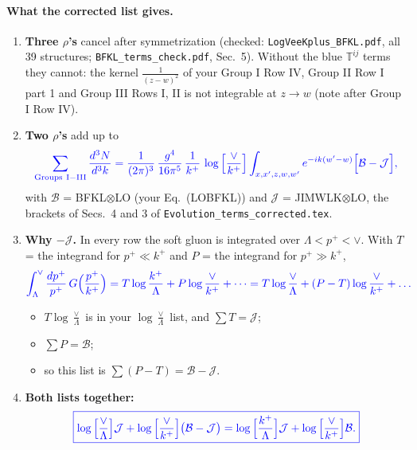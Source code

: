 \documentclass[9pt]{article}
\newcommand{\new}[1]{{\color{blue}#1}}
\numberwithin{equation}{section}
\begin{document}
\paragraph{\new{What the corrected list gives.}}
\begin{enumerate}
\item \new{\textbf{Three $\rho$'s} cancel after symmetrization (checked: \texttt{LogVeeKplus\_BFKL.pdf}, all 39 structures; \texttt{BFKL\_terms\_check.pdf}, Sec.~5). Without the blue $\mathbb T^{ij}$ terms they cannot: the kernel $\frac{1}{(z-w)^2}$ of your Group I Row IV, Group II Row I part 1 and Group III Rows I, II is not integrable at $z\to w$ (note after Group I Row IV).}
\item \new{\textbf{Two $\rho$'s} add up to}
\begin{equation}
\new{\sum_{\rm Groups\ I-III}\frac{d^3N}{d^3k}=\frac{1}{(2\pi)^{3}}\,\frac{g^{4}}{16\pi^{5}}\,\frac{1}{k^{+}}\,\log\Big[\frac{\vee}{k^{+}}\Big]\int_{x,x',z,w,w'}e^{-ik(w'-w)}\Big[\mathcal B-\mathcal J\Big],}
\end{equation}
\new{with $\mathcal B$ = BFKL$\otimes$LO (your Eq.~(LOBFKL)) and $\mathcal J$ = JIMWLK$\otimes$LO, the brackets of Secs.~4 and 3 of \texttt{Evolution\_terms\_corrected.tex}.}
\item \new{\textbf{Why $-\mathcal J$.} In every row the soft gluon is integrated over $\Lambda<p^+<\vee$. With $T$ = the integrand for $p^+\ll k^+$ and $P$ = the integrand for $p^+\gg k^+$,}
\begin{equation*}
\new{\int_\Lambda^\vee\frac{dp^+}{p^+}\,G\Big(\frac{p^+}{k^+}\Big)=T\log\frac{k^+}{\Lambda}+P\log\frac{\vee}{k^+}+\dots=T\log\frac{\vee}{\Lambda}+(P-T)\log\frac{\vee}{k^+}+\dots}
\end{equation*}
\begin{itemize}
\item \new{$T\log\frac{\vee}{\Lambda}$ is in your $\log\frac{\vee}{\Lambda}$ list, and $\sum T=\mathcal J$;}
\item \new{$\sum P=\mathcal B$;}
\item \new{so this list is $\sum(P-T)=\mathcal B-\mathcal J$.}
\end{itemize}
\item \new{\textbf{Both lists together:}}
\begin{equation}
\new{\boxed{\log\Big[\frac{\vee}{\Lambda}\Big]\mathcal J+\log\Big[\frac{\vee}{k^+}\Big]\big(\mathcal B-\mathcal J\big)=\log\Big[\frac{k^+}{\Lambda}\Big]\mathcal J+\log\Big[\frac{\vee}{k^+}\Big]\mathcal B.}}
\label{eq:both}
\end{equation}

\end{enumerate}
\end{document}
